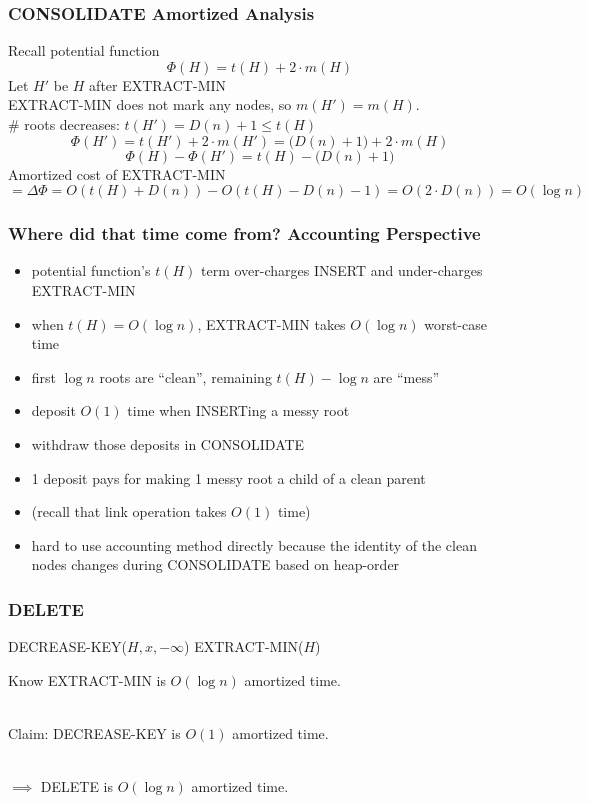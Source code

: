 \documentclass{beamer}
\newcommand{\stanza}{ \\~\ }
\begin{document}
\begin{frame} \frametitle{CONSOLIDATE Amortized Analysis}
Recall potential function
\[ \Phi(H) = t(H) + 2 \cdot m(H) \]
Let $H'$ be $H$ after EXTRACT-MIN \\
EXTRACT-MIN does not mark any nodes, so $m(H') = m(H).$ \\
\# roots decreases: $t(H') = D(n)+1 \leq t(H)$
\[ \Phi(H') = t(H') + 2 \cdot m(H') = \big(D(n)+1\big) + 2 \cdot m(H) \]
\[ \Phi(H) - \Phi(H') = t(H) - \big(D(n)+1\big) \]
Amortized cost of EXTRACT-MIN
\[ = \Delta\Phi = O(t(H) + D(n)) - O(t(H) - D(n) - 1) = O(2\cdot D(n)) = O(\log n) \]
\end{frame}

\begin{frame} \frametitle{Where did that time come from? Accounting Perspective}
\begin{itemize}
  \item potential function's $t(H)$ term over-charges INSERT and under-charges EXTRACT-MIN
  \item when $t(H) = O(\log n)$, EXTRACT-MIN takes $O(\log n)$ worst-case time
  \item first $\log n$ roots are ``clean'', remaining $t(H)-\log n$ are ``mess''
  \item deposit $O(1)$ time when INSERTing a messy root
  \item withdraw those deposits in CONSOLIDATE
  \item 1 deposit pays for making 1 messy root a child of a clean parent
  \item (recall that link operation takes $O(1)$ time)
  \item hard to use accounting method directly because the identity of the clean
    nodes changes during CONSOLIDATE based on heap-order
\end{itemize}
\end{frame}

\begin{frame} \frametitle{DELETE}
  \begin{algorithmic}[1]
    \State DECREASE-KEY($H, x, -\infty$)
    \State EXTRACT-MIN($H$)
    \EndFunction
  \end{algorithmic}
\vspace{.5cm}
Know EXTRACT-MIN is $O(\log n)$ amortized time. \stanza

Claim: DECREASE-KEY is $O(1)$ amortized time. \stanza

$\implies$ DELETE is $O(\log n)$ amortized time.
\end{frame}
\end{document}
